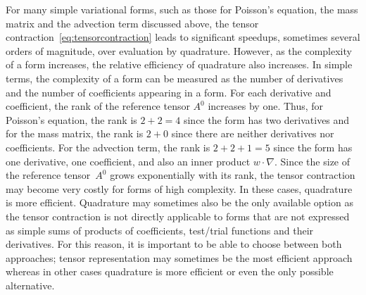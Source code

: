 For many simple variational forms, such as those for Poisson's
equation, the mass matrix and the advection term discussed above, the
tensor contraction~\eqref{eq:tensorcontraction} leads to significant
speedups, sometimes several orders of magnitude, over evaluation by
quadrature. However, as the complexity of a form increases, the
relative efficiency of quadrature also increases. In simple terms, the
complexity of a form can be measured as the number of derivatives and
the number of coefficients appearing in a form. For each derivative
and coefficient, the rank of the reference tensor $A^0$ increases by
one. Thus, for Poisson's equation, the rank is $2 + 2 = 4$ since the
form has two derivatives and for the mass matrix, the rank is $2 + 0$
since there are neither derivatives nor coefficients. For the
advection term, the rank is $2 + 2 + 1 = 5$ since the form has one
derivative, one coefficient, and also an inner product $w
\cdot \nabla$. Since the size of the reference tensor~$A^0$ grows exponentially
with its rank, the tensor contraction may become very costly for forms
of high complexity. In these cases, quadrature is more
efficient. Quadrature may sometimes also be the only available option
as the tensor contraction is not directly applicable to forms that are
not expressed as simple sums of products of coefficients, test/trial
functions and their derivatives. For this reason, it is important to
be able to choose between both approaches; tensor representation may
sometimes be the most efficient approach whereas in other cases
quadrature is more efficient or even the only possible alternative.
